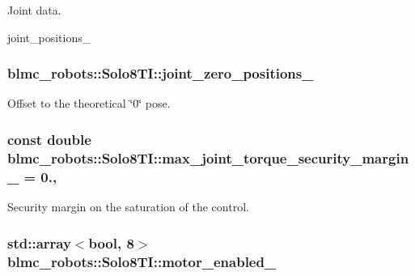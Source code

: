 Joint data. 

joint\+\_\+positions\+\_\+ 
\subsubsection[{\texorpdfstring{joint\+\_\+zero\+\_\+positions\+\_\+}{joint_zero_positions_}}]{ blmc\+\_\+robots\+::\+Solo8\+T\+I\+::joint\+\_\+zero\+\_\+positions\+\_\+\hspace{0.3cm}{\ttfamily [private]}}\hypertarget{classblmc__robots_1_1Solo8TI_a9dfb11213122b0a882dd54720ec719c3}{}\label{classblmc__robots_1_1Solo8TI_a9dfb11213122b0a882dd54720ec719c3}


Offset to the theoretical \char`\"{}0\char`\"{} pose. 

\subsubsection[{\texorpdfstring{max\+\_\+joint\+\_\+torque\+\_\+security\+\_\+margin\+\_\+}{max_joint_torque_security_margin_}}]{\setlength{\rightskip}{0pt plus 5cm}const double blmc\+\_\+robots\+::\+Solo8\+T\+I\+::max\+\_\+joint\+\_\+torque\+\_\+security\+\_\+margin\+\_\+ = 0.\hspace{0.3cm}{\ttfamily [static]}, {\ttfamily [private]}}\hypertarget{classblmc__robots_1_1Solo8TI_ab2e5018719efa9ea068a4dc870fbb82e}{}\label{classblmc__robots_1_1Solo8TI_ab2e5018719efa9ea068a4dc870fbb82e}


Security margin on the saturation of the control. 

\subsubsection[{\texorpdfstring{motor\+\_\+enabled\+\_\+}{motor_enabled_}}]{\setlength{\rightskip}{0pt plus 5cm}std\+::array$<$bool, 8$>$ blmc\+\_\+robots\+::\+Solo8\+T\+I\+::motor\+\_\+enabled\+\_\+\hspace{0.3cm}{\ttfamily [private]}}\hypertarget{classblmc__robots_1_1Solo8TI_a3dbd4bd26b5a4273e94ced22d43a9890}{}\label{classblmc__robots_1_1Solo8TI_a3dbd4bd26b5a4273e94ced22d43a9890}


